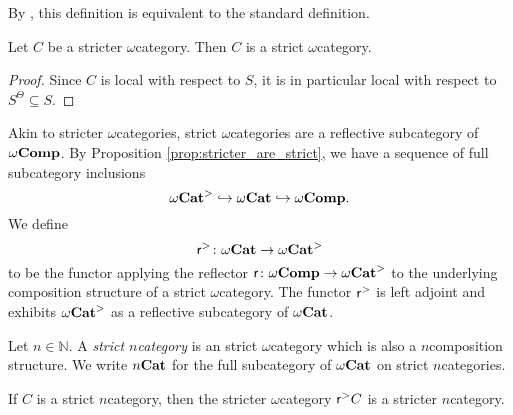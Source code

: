 \begin{rmk}
    By \cite[Theorem 1.12]{berger2002cellular}, this definition is equivalent to the standard definition.
\end{rmk}

\begin{prop} \label{prop:stricter_are_strict}
    Let \( C \) be a stricter \( \omega \)\nbd category.
    Then \( C \) is a strict \( \omega \)\nbd category.
\end{prop}
\begin{proof}
    Since \( C \) is local with respect to \( S \), it is in particular local with respect to \( S^\Theta \subseteq S \).
\end{proof} 

\noindent Akin to stricter \( \omega \)\nbd categories, strict \( \omega \)\nbd categories are a reflective subcategory of \( \omega\mathbf{Comp} \).
By Proposition \ref{prop:stricter_are_strict}, we have a sequence of full subcategory inclusions
\begin{equation*}
     {\omega\mathbf{Cat}}^> \hookrightarrow {\omega\mathbf{Cat}} \hookrightarrow \omega\mathbf{Comp}.
\end{equation*}
We define
\begin{equation*}
    \mathsf{r}^{>} \colon {\omega\mathbf{Cat}} \to {\omega\mathbf{Cat}}^>
\end{equation*}
to be the functor applying the reflector \( \mathsf{r} \colon \omega\mathbf{Comp} \to {\omega\mathbf{Cat}}^>  \) to the underlying composition structure of a strict \( \omega \)\nbd category.
The functor \( \mathsf{r}^{>} \) is left adjoint and exhibits \( {\omega\mathbf{Cat}}^> \) as a reflective subcategory of \( {\omega\mathbf{Cat}} \).

\begin{dfn} 
    Let \( n \in \mathbb{N} \).
    A \emph{strict \( n \)\nbd category} is an strict \( \omega \)\nbd category which is also a \( n \)\nbd composition structure.
    We write \( {n\mathbf{Cat}} \) for the full subcategory of \( {\omega\mathbf{Cat}} \) on strict \( n \)\nbd categories.
\end{dfn}

\begin{rmk}
    If \( C \) is a strict \( n \)\nbd category, then the stricter \( \omega \)\nbd category \( \mathsf{r}^{>} C \) is a stricter \( n \)\nbd category.
\end{rmk}

